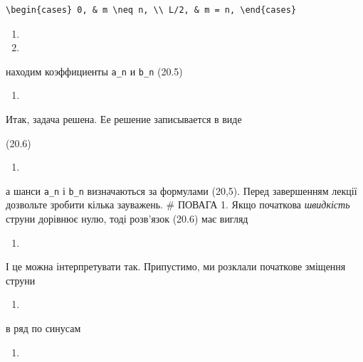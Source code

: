 \documentclass[
  ukrainian,
]{article}
\providecommand{\tightlist}{%
  \setlength{\itemsep}{0pt}\setlength{\parskip}{0pt}}
\begin{document}
\begin{verbatim}
\begin{cases} 0, & m \neq n, \\ L/2, & m = n, \end{cases}
\end{verbatim}

\begin{enumerate}
\def\labelenumi{\arabic{enumi}.}
\setcounter{enumi}{9}
\tightlist
\item
\item
\end{enumerate}

находим коэффициенты \texttt{a\_n} и \texttt{b\_n} (20.5)

\begin{enumerate}
\def\labelenumi{\arabic{enumi}.}
\setcounter{enumi}{11}
\tightlist
\item
\end{enumerate}

Итак, задача решена. Ее решение записывается в виде

(20.6)

\begin{enumerate}
\def\labelenumi{\arabic{enumi}.}
\setcounter{enumi}{12}
\tightlist
\item
\end{enumerate}

а шанси \texttt{a\_n} і \texttt{b\_n} визначаються за формулами (20,5).
Перед завершенням лекції дозвольте зробити кілька зауважень. \# ПОВАГА
1. Якщо початкова \emph{швидкість} струни дорівнює нулю, тоді розв'язок
(20.6) має вигляд

\begin{enumerate}
\def\labelenumi{\arabic{enumi}.}
\setcounter{enumi}{13}
\tightlist
\item
\end{enumerate}

І це можна інтерпретувати так. Припустимо, ми розклали початкове
зміщення струни

\begin{enumerate}
\def\labelenumi{\arabic{enumi}.}
\setcounter{enumi}{14}
\tightlist
\item
\end{enumerate}

в ряд по синусам

\begin{enumerate}
\def\labelenumi{\arabic{enumi}.}
\setcounter{enumi}{15}
\tightlist
\item
\end{enumerate}
\end{document}
